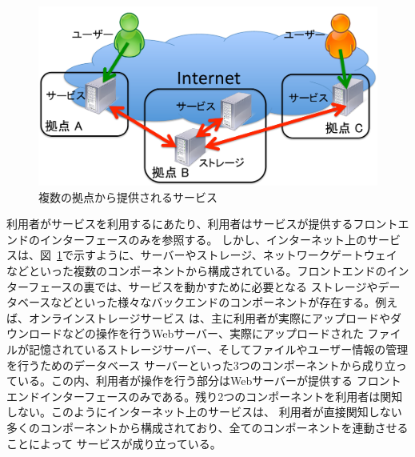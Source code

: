 \begin{figure}
	\begin{center}
		\includegraphics[scale=0.50]{./img/serviceanduser}
		\caption{複数の拠点から提供されるサービス}
		\label{img:mlservice}
	\end{center}
\end{figure}


利用者がサービスを利用するにあたり、利用者はサービスが提供するフロントエンドのインターフェースのみを参照する。
しかし、インターネット上のサービスは、図~\ref{img:mlservice}で示すように、サーバーやストレージ、ネットワークゲートウェイ
などといった複数のコンポーネントから構成されている。フロントエンドのインターフェースの裏では、サービスを動かすために必要となる
ストレージやデータベースなどといった様々なバックエンドのコンポーネントが存在する。例えば、オンラインストレージサービス
は、主に利用者が実際にアップロードやダウンロードなどの操作を行うWebサーバー、実際にアップロードされた
ファイルが記憶されているストレージサーバー、そしてファイルやユーザー情報の管理を行うためのデータベース
サーバーといった3つのコンポーネントから成り立っている。この内、利用者が操作を行う部分はWebサーバーが提供する
フロントエンドインターフェースのみである。残り2つのコンポーネントを利用者は関知しない。このようにインターネット上のサービスは、
利用者が直接関知しない多くのコンポーネントから構成されており、全てのコンポーネントを連動させることによって
サービスが成り立っている。

